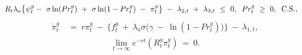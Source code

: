 \begin{equation}
\begin{split}
    & R_{t} \lambda_{a} \big\{ \psi_{t}^{g} - \ \sigma \ln(Pr_{t}^{g}) \ + \ \sigma \ln(1 - Pr_{t}^{g}) \ - \ \pi_{t}^{g} \big\} \ - \ \lambda_{2,t} \ + \ \lambda_{3,t} \ \leq \ 0, \hspace{0.2cm} Pr_{t}^{g} \ \geq \ 0,  \hspace{0.2cm} \text{C.S.},
\end{split}
\label{Equation:Firms-Problem_Necessary-Conditions_Drilling-Probability}
\end{equation}
\begin{equation}
\begin{split}
    \dot{\pi}_{t}^{g} \ 
    & = \ r \pi_{t}^{g} \ - \ \big\{ f_{t}^{g} \ + \ \lambda_{a} \sigma \big( \gamma \ - \ \ln(1 - Pr_{t}^{g}) \big) \big\} \ - \ \lambda_{1,t},
\end{split}
\label{Equation:Firms-Problem_Necessary-Conditions_Costate-Variable}
\end{equation}
\begin{equation}
\begin{split}
    \lim_{t \rightarrow \infty} e^{-rt} (R_{t}^{g} \pi_{t}^{g}) \ = \ 0.
\end{split}
\label{Equation:Firms-Problem__Transversality-Condition}
\end{equation}
